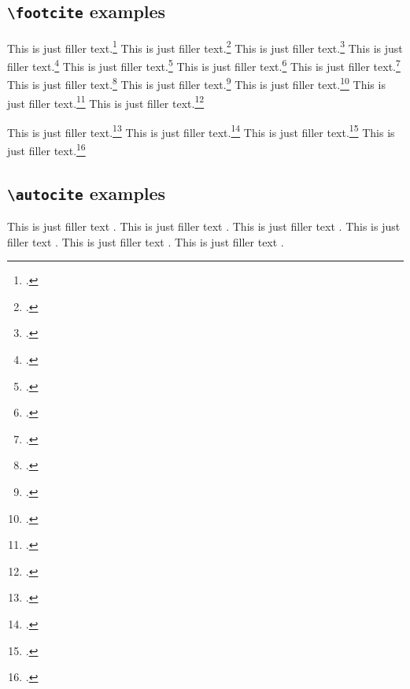 \documentclass[a4paper]{article}
\newcommand*{\cmd}[1]{\texttt{\textbackslash #1}}
\begin{document}
\clearpage

\subsection*{\cmd{footcite} examples}

This is just filler text.\footcite{aristotle:anima}
This is just filler text.\footcite{averroes/bland}
This is just filler text.\footcite[26]{aristotle:anima}
This is just filler text.\footcite[59--61]{averroes/bland}
This is just filler text.\footcite[26]{aristotle:anima}
This is just filler text.\footcite[59--61]{averroes/bland}
This is just filler text.\footcite{aristotle:physics}
This is just filler text.\footcite{averroes/bland}
This is just filler text.\footcite{aristotle:anima}
This is just filler text.\footcite[55]{aristotle:physics}
This is just filler text.\footcite[25]{aristotle:physics}
This is just filler text.\footcite[25]{aristotle:physics}

\clearpage


This is just filler text.\footcite{kant:kpv}
This is just filler text.\footcite{kant:ku}
This is just filler text.\footcite[24]{kant:kpv}
This is just filler text.\footcite[59--63]{kant:ku}

\clearpage

\subsection*{\cmd{autocite} examples}


This is just filler text \autocite{aristotle:rhetoric}.
This is just filler text \autocite{averroes/bland}.
This is just filler text \autocite{aristotle:rhetoric}.
This is just filler text \autocite{aristotle:anima}.
This is just filler text \autocite{aristotle:physics}.
This is just filler text \autocite{aristotle:physics}.

\clearpage


\printshorthands
\printbibliography
\end{document}
